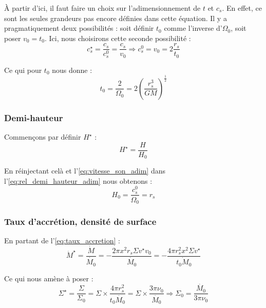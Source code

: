 À partir d’ici, il faut faire un choix sur l’adimensionnement de $t$ et $c_s$.
En effet, ce sont les seules grandeurs pas encore définies dans cette équation.
Il y a pragmatiquement deux possibilités : soit définir $t_0$ comme l’inverse
d’$\Omega_0$, soit poser $v_0 = t_0$. Ici, nous choisirons cette seconde
possibilité :
\begin{equation}
    \label{eq:vitesse_son_adim}
    c_s^\star = \frac{c_s}{c_s^0} = \frac{c_s}{v_0} \Rightarrow c_s^0 = v_0 = 2 \frac{r_s}{t_0}
\end{equation}

Ce qui pour $t_0$ nous donne :
\begin{equation}
    t_0 = \frac{2}{\Omega_0} = 2 \left( \frac{r_s^3}{G M} \right)^\frac{1}{2}
\end{equation}    

\subsubsection{Demi-hauteur}

Commençons par définir $H^\star$ :
\begin{equation}
    H^\star = \frac{H}{H_0}
\end{equation}

En réinjectant celà et l’\cref{eq:vitesse_son_adim} dans
l’\cref{eq:rel_demi_hauteur_adim} nous obtenons :
\begin{equation}
    \label{eq:demi_hauteur_adim}
    H_0 = \frac{c_s^0}{\Omega_0} = r_s
\end{equation}

\subsubsection{Taux d’accrétion, densité de surface}

En partant de l’\cref{eq:taux_accretion} :
\begin{equation}
    \dot{M}^\star = \frac{\dot{M}}{\dot{M_0}} = - \frac{2 \pi x^2 r_s \Sigma v^\star v_0}{\dot{M_0}} = - \frac{4 \pi r_s^2 x^2 \Sigma v^\star}{\dot{t_0 M_0}}
\end{equation}

Ce qui nous amène à poser :
\begin{equation}
    \label{eq:densite_surface_adim}
    \Sigma^\star = \frac{\Sigma}{\Sigma_0} = \Sigma \times \frac{4 \pi r_s^2}{t_0 \dot{M_0}} = \Sigma \times \frac{3 \pi \nu_0}{\dot{M_0}} \Rightarrow \Sigma_0 = \frac{\dot{M_0}}{3 \pi \nu_0}
\end{equation}


